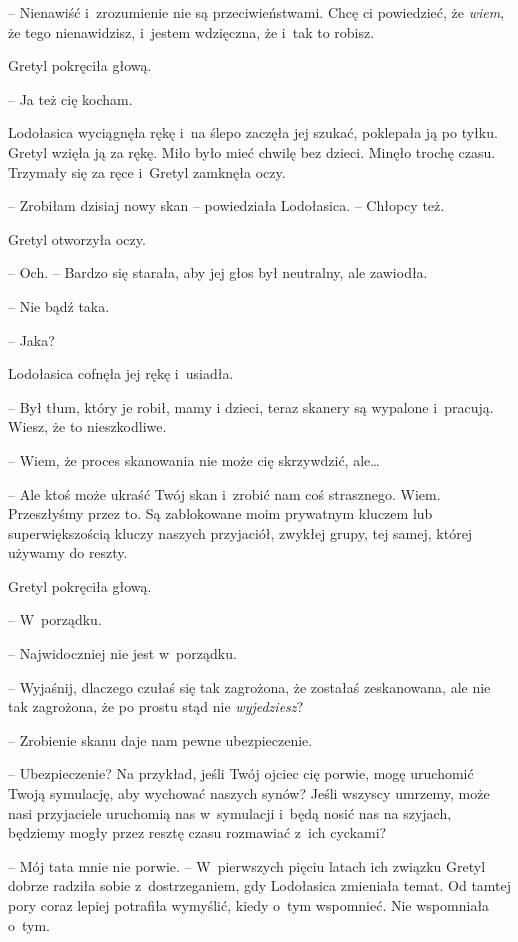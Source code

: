 \documentclass[oneside,polish,11pt,sfheadings]{mwbk}
\begin{document}
-- Nienawiść i~zrozumienie nie są przeciwieństwami. Chcę ci powiedzieć,
że \textit{wiem}, że tego nienawidzisz, i~jestem wdzięczna, że i~tak to
robisz.

Gretyl pokręciła głową. 

-- Ja też cię kocham.

Lodołasica wyciągnęła rękę i~na ślepo zaczęła jej szukać, poklepała ją
po tyłku. Gretyl wzięła ją za rękę. Miło było mieć chwilę bez dzieci.
Minęło trochę czasu. Trzymały się za ręce i~Gretyl zamknęła oczy.

-- Zrobiłam dzisiaj nowy skan -- powiedziała Lodołasica. -- Chłopcy też.

Gretyl otworzyła oczy. 

-- Och. -- Bardzo się starała, aby jej głos był
neutralny, ale zawiodła.

-- Nie bądź taka.

-- Jaka?

Lodołasica cofnęła jej rękę i~usiadła. 

-- Był tłum, który je robił, mamy
i dzieci, teraz skanery są wypalone i~pracują. Wiesz, że to
nieszkodliwe.

-- Wiem, że proces skanowania nie może cię skrzywdzić, ale\ldots 

-- Ale ktoś może ukraść Twój skan i~zrobić nam coś strasznego. Wiem.
Przeszłyśmy przez to. Są zablokowane moim prywatnym kluczem lub
superwiększością kluczy naszych przyjaciół, zwykłej grupy, tej samej,
której używamy do reszty.

Gretyl pokręciła głową. 

-- W~porządku.

-- Najwidoczniej nie jest w~porządku.

-- Wyjaśnij, dlaczego czułaś się tak zagrożona, że zostałaś zeskanowana,
ale nie tak zagrożona, że po prostu stąd nie \textit{wyjedziesz}?

-- Zrobienie skanu daje nam pewne ubezpieczenie.

-- Ubezpieczenie? Na przykład, jeśli Twój ojciec cię porwie, mogę
uruchomić Twoją symulację, aby wychować naszych synów? Jeśli wszyscy
umrzemy, może nasi przyjaciele uruchomią nas w~symulacji i~będą nosić
nas na szyjach, będziemy mogły przez resztę czasu rozmawiać z~ich
cyckami?

-- Mój tata mnie nie porwie. -- W~pierwszych pięciu latach ich związku
Gretyl dobrze radziła sobie z~dostrzeganiem, gdy Lodołasica zmieniała
temat. Od tamtej pory coraz lepiej potrafiła wymyślić, kiedy o~tym
wspomnieć. Nie wspomniała o~tym.
\end{document}
